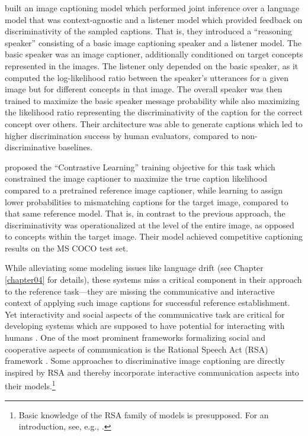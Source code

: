 \cite{vedantam2017context} built an image captioning model which performed joint inference over a language model that was context-agnostic and a listener model which provided feedback on discriminativity of the sampled captions. That is, they introduced a ``reasoning speaker'' consisting of a basic image captioning speaker and a listener model. The basic speaker was an image captioner, additionally conditioned on target concepts represented in the images. The listener only depended on the basic speaker, as it computed the log-likelihood ratio between the speaker's utterances for a given image but for different concepts in that image. The overall speaker was then trained to maximize the basic speaker message probability while also maximizing the likelihood ratio representing the discriminativity of the caption for the correct concept over others.
Their architecture was able to generate captions which led to higher discrimination success by human evaluators, compared to non-discriminative baselines.

\cite{dai2017contrastive} proposed the ``Contrastive Learning'' training objective for this task which constrained the image captioner to maximize the true caption likelihood compared to a pretrained reference image captioner, while learning to assign lower probabilities to mismatching captions for the target image, compared to that same reference model. That is, in contrast to the previous approach, the discriminativity was operationalized at the level of the entire image, as opposed to concepts within the target image. %
Their model achieved competitive captioning results on the MS COCO test set.

While alleviating some modeling issues like language drift (see Chapter \ref{chapter04} for details), these systems miss a critical component in their approach to the reference task---they are missing the communicative and interactive context of applying such image captions for successful reference establishment. Yet interactivity and social aspects of the communicative task are critical for developing systems which are supposed to have potential for interacting with humans \parencite{lazaridou2020emergent}. One of the most prominent frameworks formalizing social and cooperative aspects of communication is the Rational Speech Act (RSA) framework \parencite{goodman2016pragmatic}. Some approaches to discriminative image captioning are directly inspired by RSA and thereby incorporate interactive communication aspects into their models.\footnote{Basic knowledge of the RSA family of models is presupposed. For an introduction, see, e.g., \cite{goodman2016pragmatic, problang}.}

